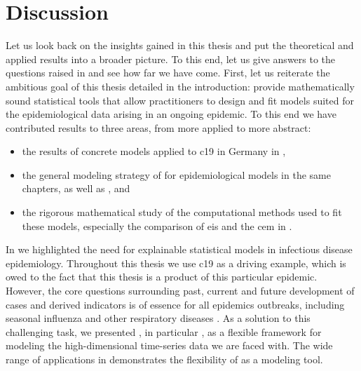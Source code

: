 \chapter{Discussion}
\label{cha:discussion}

Let us look back on the insights gained in this thesis and put the theoretical and applied results into a broader picture. To this end, let us give answers to the questions raised in  and see how far we have come. First, let us reiterate the ambitious goal of this thesis detailed in the introduction: provide mathematically sound statistical tools that allow practitioners to design and fit models suited for the epidemiological data arising in an ongoing epidemic. To this end we have contributed results to three areas, from more applied to more abstract:
\begin{itemize}
    \item the results of concrete models applied to \acrshort{c19} in Germany in ,
    \item the general modeling strategy of  for epidemiological models in the same chapters, as well as , and
    \item the rigorous mathematical study of the computational methods used to fit these models, especially the comparison of \acrshort{eis} and the \acrshort{cem} in .
\end{itemize} 


In  we highlighted the need for explainable statistical models in infectious disease epidemiology. Throughout this thesis we use \acrshort{c19} as a driving example, which is owed to the fact that this thesis is a product of this particular epidemic. However, the core questions surrounding past, current and future development of cases and derived indicators is of essence for all epidemics outbreaks, including seasonal influenza and other respiratory diseases . As a solution to this challenging task, we presented , in particular , as a flexible framework for modeling the high-dimensional time-series data we are faced with. The wide range of applications in  demonstrates the flexibility of  as a modeling tool. 


